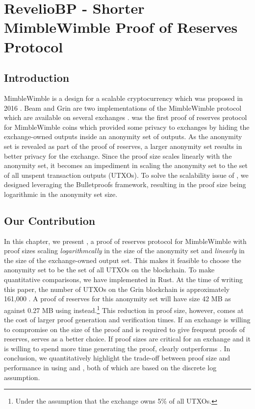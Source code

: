 \chapter{\textnormal{{\selectfont RevelioBP}} - Shorter MimbleWimble Proof of Reserves Protocol}
\label{chap:revBP}

\section{Introduction}

MimbleWimble is a design for a scalable cryptocurrency which was proposed in 2016 \cite{Jedusor2016}. Beam and Grin are two implementations of the MimbleWimble protocol which are available on several exchanges \cite{Coinmarketcap}. \R \cite{Dutta2019b} was the first proof of reserves protocol for MimbleWimble coins which provided some privacy to exchanges by hiding the exchange-owned outputs inside an anonymity set of outputs. As the anonymity set is revealed as part of the proof of reserves, a larger anonymity set results in better privacy for the exchange. Since the \R proof size scales linearly with the anonymity set, it becomes an impediment in scaling the anonymity set to the set of all unspent transaction outputs (UTXOs).
To solve the scalability issue of \Rw, we designed \RB leveraging the Bulletproofs \cite{Bunz2018} framework, resulting in the proof size being logarithmic in the anonymity set size.\\[-6pt]   

\section{Our Contribution}
In this chapter, we present \Rplus, a proof of reserves protocol for MimbleWimble with proof sizes scaling \textit{logarithmcally} in the size of the anonymity set and \textit{linearly} in the size of the exchange-owned output set.
This makes it feasible to choose the anonymity set to be the set of all UTXOs on the blockchain.  
To make quantitative comparisons, we have implemented \RB  in Rust.
At the time of writing this paper, the number of UTXOs on the Grin blockchain is approximately 161,000 \cite{GrinScanWebsite}.
A \R proof of reserves for this anonymity set will have size 42 MB as against 0.27 MB using \RPlus instead.\footnote{Under the assumption that the exchange owns 5\% of all UTXOs.}
This reduction in proof size, however, comes at the cost of larger proof generation and verification times. If an exchange is willing to compromise on the size of the proof and is required to give frequent proofs of reserves,
\R serves as a better choice. If proof sizes are critical for an exchange and it is willing to spend more time generating the proof, \RB clearly outperforms \Rw.   
In conclusion, we quantitatively highlight the trade-off between proof size and performance in using \R and \RBw, both of which are based on the discrete log assumption.

